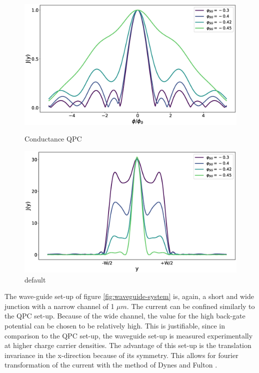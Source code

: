\begin{figure}[ht]
\begin{minipage}[b]{0.5\linewidth}
\centering
\includegraphics[width=\textwidth]{figure/numericalmodel/waveguide-ic}
\caption{Conductance QPC} \label{fig:waveguide-ic}
\end{minipage}
\begin{minipage}[b]{0.5\linewidth}
\centering
\includegraphics[width=\textwidth]{figure/numericalmodel/waveguide-jy}
\caption{default}\label{fig:waveguide-jy}
\end{minipage}
\end{figure}
The wave-guide set-up of figure \ref{fig:waveguide-system} is, again, a short and wide junction with a narrow channel of 1 $\mu m$. The current can be confined similarly to the QPC set-up. Because of the wide channel, the value for the high back-gate potential can be chosen to be relatively high. This is justifiable, since in comparison to the QPC set-up, the waveguide set-up is measured experimentally at higher charge carrier densities. The advantage of this set-up is the translation invariance in the x-direction because of its symmetry. This allows for fourier transformation of the current with the method of Dynes and Fulton \cite{Dynes1971}.

